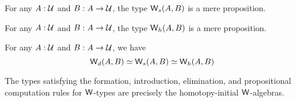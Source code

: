 \documentclass[hott-all.tex]{subfiles}
\begin{document}
% 
% 
\begin{thm}
For any $A : \mathcal{U}$ and $B : A \to \mathcal{U}$, the type $\mathsf{W}_s (A,B)$ is a mere proposition.
\end{thm}
% 
% 
\begin{thm}
For any $A : \mathcal{U}$ and $B : A \to \mathcal{U}$, the type $\mathsf{W}_h (A,B)$ is a mere proposition.
\end{thm}
% 
\begin{lem}
For any $A : \mathcal{U}$ and $B : A \to \mathcal{U}$, we have
\[ \mathsf{W}_d(A,B) \simeq \mathsf{W}_s(A,B) \simeq \mathsf{W}_h(A,B) \]
\end{lem}
% 
% 
\begin{thm}
The types satisfying the formation, introduction, elimination, and propositional computation rules for $\mathsf{W}$-types are precisely the homotopy-initial $\mathsf{W}$-algebras.
\end{thm}
\end{document}

